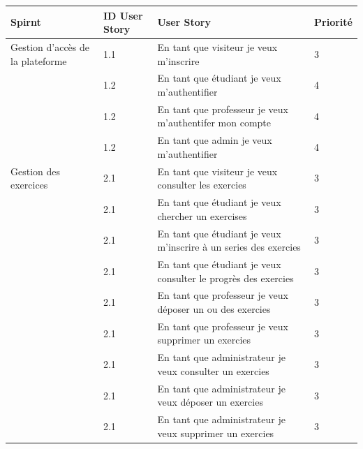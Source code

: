 	\begin{table}[H] %
	    \centering
	    \begin{tabular}{|p{3cm}|p{1.5cm}|p{7cm}|p{1.3cm}|}
	        \hline
	        Spirnt & ID User Story & User Story & Priorité \\
	        \hline
	        Gestion d'accès de la plateforme & 1.1 & En tant que visiteur je veux m'inscrire & 3 \\ \hline
        & 1.2 &  En tant que étudiant je veux m’authentifier & 4 \\ \hline 
        & 1.2 &  En tant que professeur je veux m'authentifer  mon compte & 4 \\ \hline 
        & 1.2 &  En tant que admin je veux m'authentifier & 4 \\ \hline 
		









        Gestion des exercices 
        & 2.1 &  En tant que visiteur je veux consulter les exercies & 3 \\ \hline
        & 2.1 &  En tant que étudiant je veux chercher un exercises & 3 \\ \hline
        & 2.1 &  En tant que étudiant je veux m’inscrire à un series des exercies & 3 \\ \hline
        & 2.1 &  En tant que étudiant je veux consulter le progrès des exercies & 3 \\ \hline
        & 2.1 &  En tant que professeur je veux déposer un ou des exercies & 3 \\ \hline
        & 2.1 & En tant que professeur je veux supprimer un exercies & 3 \\ \hline
        & 2.1 & En tant que administrateur je veux consulter un exercies & 3 \\ \hline
        & 2.1 & En tant que administrateur je veux déposer un exercies & 3 \\ \hline
        & 2.1 & En tant que administrateur je veux supprimer un exercies & 3 \\ \hline













\end{tabular}
\end{table}
